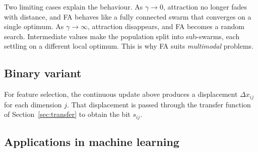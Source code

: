 \documentclass[11pt,a4paper]{article}
\begin{document}
Two limiting cases explain the behaviour. As $\gamma \to 0$, attraction no longer fades with distance, and FA behaves like a fully connected swarm that converges on a single optimum. As $\gamma \to \infty$, attraction disappears, and FA becomes a random search. Intermediate values make the population split into sub-swarms, each settling on a different local optimum. This is why FA suits \emph{multimodal} problems.

\subsection{Binary variant}

For feature selection, the continuous update above produces a displacement $\Delta x_{ij}$ for each dimension $j$. That displacement is passed through the transfer function of Section~\ref{sec:transfer} to obtain the bit $s_{ij}$.

\subsection{Applications in machine learning}
\end{document}
